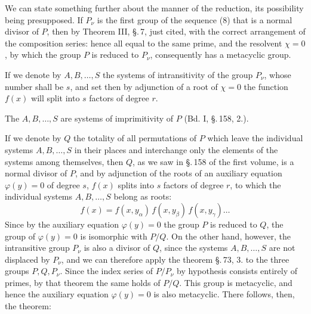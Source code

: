 
We can state something further about the manner of the reduction, its possibility
being presupposed. If $P_\nu$ is the first group of the sequence (8) that is a
normal divisor of $P$, then by Theorem III, §.\,7, just cited, with the correct
arrangement of the composition series:
hence all equal to the same prime, and the resolvent $\chi = 0$, by which the
group $P$ is reduced to $P_\nu$, consequently has a metacyclic group.

If we denote by $A, B, \ldots, S$ the systems of intransitivity of the group
$P_\nu$, whose number shall be $s$, and set
then by adjunction of a root of $\chi = 0$ the function $f(x)$ will split into
$s$ factors of degree $r$.

The $A, B, \ldots, S$ are systems of imprimitivity of $P$ (Bd. I, §.\,158, 2.).

If we denote by $Q$ the totality of all permutations of $P$ which leave the
individual systems $A, B, \ldots, S$ in their places and interchange only the
elements of the systems among themselves, then $Q$, as we saw in §.\,158 of the
first volume, is a normal divisor of $P$, and by adjunction of the roots of an
auxiliary equation $\varphi(y) = 0$ of degree $s$, $f(x)$ splits into $s$
factors of degree $r$, to which the individual systems $A, B, \ldots, S$ belong
as roots:
\[
f(x) = f(x, y_\alpha)\, f(x, y_\beta)\, f(x, y_\gamma) \ldots
\]
Since by the auxiliary equation $\varphi(y) = 0$ the group $P$ is reduced to
$Q$, the group of $\varphi(y) = 0$ is isomorphic with $P/Q$. On the other hand,
however, the intransitive group $P_\nu$ is also a divisor of $Q$, since the
systems $A, B, \ldots, S$ are not displaced by $P_\nu$, and we can therefore
apply the theorem §.\,73, 3. to the three groups $P, Q, P_\nu$. Since the index
series of $P/P_\nu$ by hypothesis consists entirely of primes, by that
theorem the same holds of $P/Q$. This group is metacyclic, and hence the
auxiliary equation $\varphi(y) = 0$ is also metacyclic. There follows, then,
the theorem:
